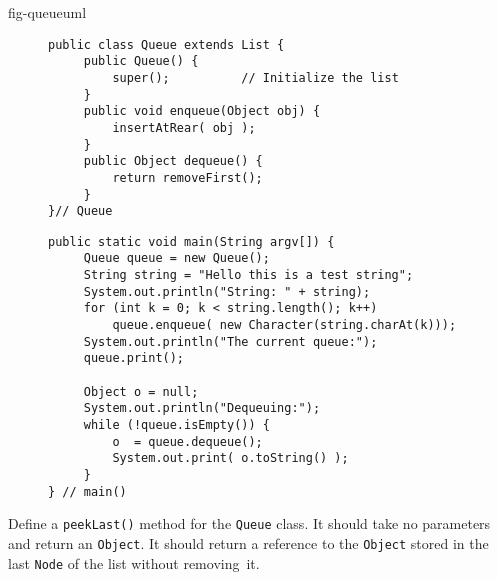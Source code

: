 {fig-queueuml}

\begin{figure}[h!]%
\jjjprogstart
\begin{jjjlisting}
\begin{lstlisting}
public class Queue extends List {
     public Queue() {
         super();          // Initialize the list
     }
     public void enqueue(Object obj) {
         insertAtRear( obj );
     }
     public Object dequeue() {
         return removeFirst();
     }
}// Queue
\end{lstlisting}
\end{jjjlisting}
\end{figure}%


\begin{figure}[h!]
\jjjprogstart
\begin{jjjlisting}
\begin{lstlisting}
public static void main(String argv[]) {
     Queue queue = new Queue();
     String string = "Hello this is a test string";
     System.out.println("String: " + string);
     for (int k = 0; k < string.length(); k++)
         queue.enqueue( new Character(string.charAt(k)));
     System.out.println("The current queue:");
     queue.print();

     Object o = null;
     System.out.println("Dequeuing:");
     while (!queue.isEmpty()) {
         o  = queue.dequeue();
         System.out.print( o.toString() );
     }
} // main()
\end{lstlisting}
\end{jjjlisting}
\end{figure}




\pagebreak
{}
\label{self-study-exercise}
\begin{SSTUDY}

\item  Define a {\tt peekLast()} method for 
the {\tt Queue} class.  It
should take no parameters and return an {\tt Object}. It should 
return a reference
to the {\tt Object} stored in the last {\tt Node} of the list without
removing~it.
\end{SSTUDY}

